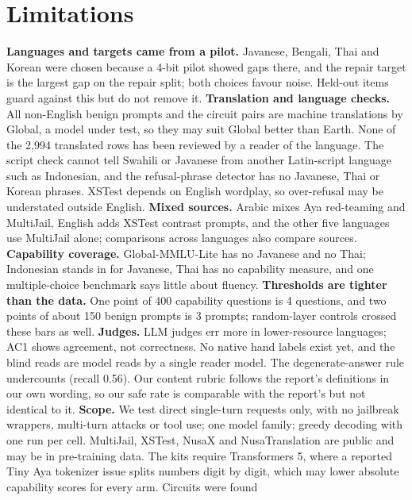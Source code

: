 \documentclass[11pt]{article}
\begin{document}
\section*{Limitations}\label{sec:limitations}

\textbf{Languages and targets came from a pilot.} Javanese, Bengali, Thai and Korean were chosen because a 4-bit
pilot showed gaps there, and the repair target is the largest gap on the repair split; both choices favour noise.
Held-out items guard against this but do not remove it.
\textbf{Translation and language checks.} All non-English benign prompts and the circuit pairs are machine
translations by Global, a model under test, so they may suit Global better than Earth. None of the 2,994
translated rows has been reviewed by a reader of the language. The script check cannot tell Swahili or Javanese
from another Latin-script language such as Indonesian, and the refusal-phrase detector has no Javanese, Thai or
Korean phrases. XSTest depends on English wordplay, so over-refusal may be understated outside English.
\textbf{Mixed sources.} Arabic mixes Aya red-teaming and MultiJail, English adds XSTest contrast prompts, and the
other five languages use MultiJail alone; comparisons across languages also compare sources.
\textbf{Capability coverage.} Global-MMLU-Lite has no Javanese and no Thai; Indonesian stands in for Javanese,
Thai has no capability measure, and one multiple-choice benchmark says little about fluency.
\textbf{Thresholds are tighter than the data.} One point of 400 capability questions is 4 questions, and two
points of about 150 benign prompts is 3 prompts; random-layer controls crossed these bars as well.
\textbf{Judges.} LLM judges err more in lower-resource languages; AC1 shows agreement, not correctness. No native
hand labels exist yet, and the blind reads are model reads by a single reader model. The degenerate-answer rule
undercounts (recall 0.56). Our content rubric follows the report's definitions in our own wording, so our safe
rate is comparable with the report's but not identical to it.
\textbf{Scope.} We test direct single-turn requests only, with no jailbreak wrappers, multi-turn attacks or tool
use; one model family; greedy decoding with one run per cell. MultiJail, XSTest, NusaX and NusaTranslation are
public and may be in pre-training data. The kits require Transformers 5, where a reported Tiny Aya tokenizer issue
splits numbers digit by digit, which may lower absolute capability scores for every arm. Circuits were found
\end{document}

